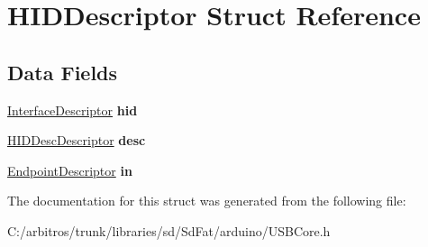 \hypertarget{struct_h_i_d_descriptor}{\section{H\-I\-D\-Descriptor Struct Reference}
\label{struct_h_i_d_descriptor}
}
\subsection*{Data Fields}
\begin{DoxyCompactItemize}
\item 
\hypertarget{struct_h_i_d_descriptor_a81907e74fcb6fd20130a4a921e4be5fd}{\hyperlink{struct_interface_descriptor}{Interface\-Descriptor} {\bfseries hid}}\label{struct_h_i_d_descriptor_a81907e74fcb6fd20130a4a921e4be5fd}

\item 
\hypertarget{struct_h_i_d_descriptor_ae46b89dcb6c43addf455fc25ebbf9963}{\hyperlink{struct_h_i_d_desc_descriptor}{H\-I\-D\-Desc\-Descriptor} {\bfseries desc}}\label{struct_h_i_d_descriptor_ae46b89dcb6c43addf455fc25ebbf9963}

\item 
\hypertarget{struct_h_i_d_descriptor_a93dcef3b3e3062b904269bcad94771b5}{\hyperlink{struct_endpoint_descriptor}{Endpoint\-Descriptor} {\bfseries in}}\label{struct_h_i_d_descriptor_a93dcef3b3e3062b904269bcad94771b5}

\end{DoxyCompactItemize}


The documentation for this struct was generated from the following file\-:\begin{DoxyCompactItemize}
\item 
C\-:/arbitros/trunk/libraries/sd/\-Sd\-Fat/arduino/U\-S\-B\-Core.\-h\end{DoxyCompactItemize}
